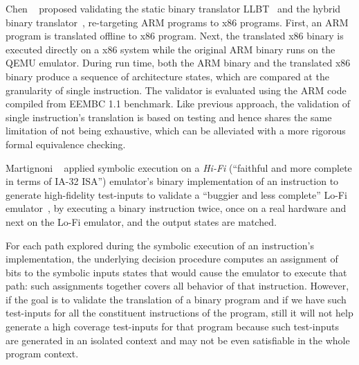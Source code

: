 
Chen \etal~\cite{CLSS2015} proposed validating the static binary translator
LLBT~\cite{LLBT2012} and the hybrid binary translator~\cite{LLVMDBT2012},
  re-targeting ARM programs to x86 programs. First, an ARM program is
  translated offline to x86 program. Next, the translated x86 binary is
  executed  directly on a x86 system while the original ARM binary runs on the
  QEMU emulator. During run time, both the ARM binary and the translated x86
  binary produce a sequence of  architecture states, which are compared at the
  granularity of single instruction. The validator is
  evaluated using the ARM code compiled from EEMBC 1.1 benchmark. Like previous 
  approach, the validation of single instruction's translation is 
based on testing and hence shares the same limitation of not being exhaustive, 
which can be alleviated with  a more rigorous formal equivalence checking.

Martignoni \etal~\cite{Martignoni:ASPLOS2012} applied symbolic execution on a 
\emph{Hi-Fi} (``faithful and more complete in terms of IA-32 ISA'') 
emulator\cite{Bochs1996}'s binary implementation of an instruction to generate 
high-fidelity test-inputs to validate a ``buggier and less complete'' Lo-Fi 
emulator~\cite{QEMU:USENIX05},
by executing a binary instruction twice, once on a real hardware and next on
the Lo-Fi emulator, and the output states are matched.

For each path explored during the symbolic execution of an instruction's 
implementation, the underlying decision procedure computes an assignment of 
bits to the symbolic inputs states that would cause the emulator to execute 
that path: such assignments together covers all behavior of that instruction.
However, if the goal is to validate the translation of a binary program and if 
we have 
such test-inputs for  all the constituent instructions of the
program, still it will not help generate a high coverage test-inputs for that 
program because  such test-inputs are generated in an isolated 
context and may not be even satisfiable in the whole program context.


